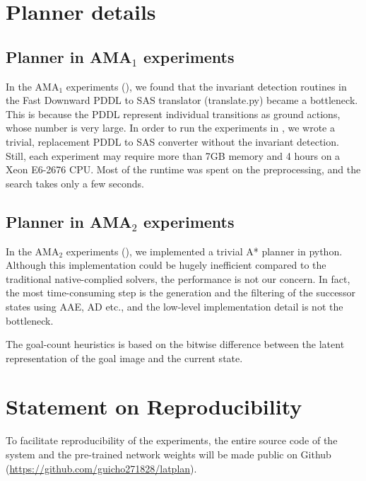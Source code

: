 \documentclass[11pt]{article}
\begin{document}
\section{Planner details}

\subsection{Planner in AMA$_1$ experiments}
\label{sec:ama1-planner}

In the AMA$_1$ experiments (),
we found that the invariant detection
routines in the Fast Downward PDDL to SAS translator (translate.py)
became a bottleneck.
This is because the PDDL represent individual transitions as ground actions, whose number is very large.
In order to run the experiments in  %
,
we wrote a trivial, replacement PDDL to SAS converter without the invariant detection.
Still, each experiment may require more than 7GB memory and 4 hours on a Xeon E6-2676 CPU.
Most of the runtime was spent on the preprocessing, and the search takes only a few seconds.

\subsection{Planner in AMA$_2$ experiments}

In the AMA$_2$ experiments (), we implemented a trivial A* planner in python.
Although this implementation could be hugely inefficient compared to the traditional native-complied solvers,
the performance is not our concern.
% 
In fact, the most time-consuming step is the generation and the filtering of the successor states using AAE, AD etc.,
and the low-level implementation detail is not the bottleneck.

The goal-count heuristics is based on the bitwise difference between the
latent representation of the goal image and the current state.

\section{Statement on Reproducibility}

To facilitate reproducibility of the experiments, the entire source code of the system and the pre-trained network weights
 will be made public on Github (\url{https://github.com/guicho271828/latplan}).
\end{document}
